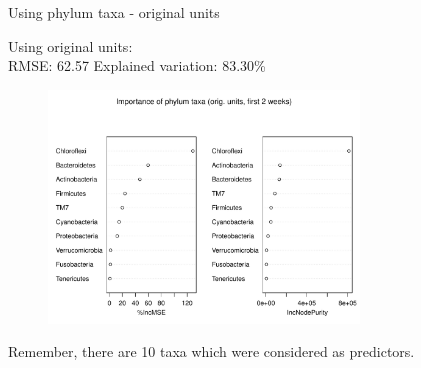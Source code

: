 \documentclass{beamer}
\begin{document}




  
    

  
  
  



\begin{frame}{Using phylum taxa - original units}

  {\scriptsize
    
  \noindent Using original units:\\
  RMSE: 62.57  \hspace{0.05in}  Explained variation: 83.30\%

  \begin{center}
    \begin{figure}
      \includegraphics[width=3.25in]{../only_phyla/first_two_weeks/orig_units_first_two_weeks_phyla_imp_plot}
    \end{figure}
  \end{center}
  \vspace{-0.25in}

\noindent Remember, there are 10 taxa which were considered as predictors.
}

\end{frame}
\end{document}
